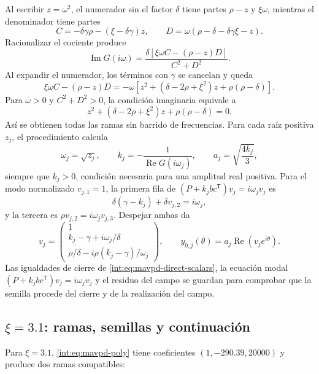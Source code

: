 Al escribir \(z=\omega^2\), el numerador sin el factor \(\delta\) tiene
partes \(\rho-z\) y \(\xi\omega\), mientras el denominador tiene partes
\[
 C=-\delta\gamma\rho-(\xi-\delta\gamma)z,\qquad
 D=\omega(\rho-\delta-\delta\gamma\xi-z).
\]
Racionalizar el cociente produce
\[
 \operatorname{Im}G(i\omega)=
 \frac{\delta[\xi\omega C-(\rho-z)D]}{C^2+D^2}.
\]
Al expandir el numerador, los términos con \(\gamma\) se cancelan y queda
\[
 \xi\omega C-(\rho-z)D
 =-\omega[z^2+(\delta-2\rho+\xi^2)z+\rho(\rho-\delta)].
\]
Para \(\omega>0\) y \(C^2+D^2>0\), la condición imaginaria equivale a
\begin{equation}
 z^2+(\delta-2\rho+\xi^2)z+\rho(\rho-\delta)=0.
 \label{int:eq:mavpd-poly}
\end{equation}
Así se obtienen todas las ramas sin barrido de frecuencias. Para cada raíz
positiva \(z_j\), el procedimiento calcula
\begin{equation}
 \omega_j=\sqrt{z_j},\qquad
 k_j=-\frac{1}{\operatorname{Re}G(i\omega_j)},\qquad
 a_j=\sqrt{\frac{4k_j}{3}},
 \label{int:eq:mavpd-direct-scalars}
\end{equation}
siempre que \(k_j>0\), condición necesaria para una amplitud real positiva.
Para el modo normalizado \(v_{j,1}=1\), la primera fila de
\((P+k_jbc^{\mathsf T})v_j=i\omega_jv_j\) es
\[
 \delta(\gamma-k_j)+\delta v_{j,2}=i\omega_j,
\]
y la tercera es \(\rho v_{j,2}=i\omega_jv_{j,3}\). Despejar ambas da
\begin{equation}
 v_j=\begin{pmatrix}
 1\\
 k_j-\gamma+i\omega_j/\delta\\
 \rho/\delta-i\rho(k_j-\gamma)/\omega_j
 \end{pmatrix},\qquad
 y_{0,j}(\theta)=a_j\operatorname{Re}\!\left(v_je^{i\theta}\right).
 \label{int:eq:mavpd-direct-seed}
\end{equation}
Las igualdades de cierre de \eqref{int:eq:mavpd-direct-scalars}, la ecuación modal
\((P+k_jbc^{\mathsf T})v_j=i\omega_jv_j\) y el residuo del campo se guardan
para comprobar que la semilla procede del cierre y de la realización del campo.

\subsection{\texorpdfstring{\(\xi=3.1\): ramas, semillas y continuación}{xi=3.1: ramas, semillas y continuación}}

Para \(\xi=3.1\), \eqref{int:eq:mavpd-poly} tiene coeficientes
\((1,-290.39,20000)\) y produce dos ramas compatibles:

